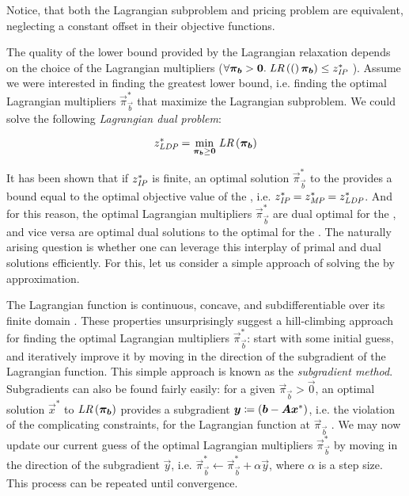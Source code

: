 Notice, that both the Lagrangian subproblem and pricing problem are equivalent, neglecting a constant offset in their objective functions.

The quality of the lower bound provided by the Lagrangian relaxation depends on the choice of the Lagrangian multipliers ($\forall \vec{\pi}_\vec{b} > \vec{0}. \; \LR(\vec{\pi}_\vec{b}) \leq z^*_\IP{}$ \cite{thebook}). Assume we were interested in finding the greatest lower bound, i.e. finding the optimal Lagrangian multipliers $\vec{\pi}_\vec{b}^*$ that maximize the Lagrangian subproblem. We could solve the following \textit{Lagrangian dual problem}:

\begin{equation*}
z^*_\LDP{} = \underset{\vec{\pi}_\vec{b} \geq \vec{0}}{\min} \; \LR{\vec{\pi}_\vec{b}}
\end{equation*}

It has been shown that if $z^*_{\textit{IP}}{}$ is finite, an optimal solution $\vec{\pi}_\vec{b}^*$ to the \LDP{} provides a bound equal to the optimal objective value of the \MP{}, i.e. $z^*_{\textit{IP}}{} = z^*_{\textit{MP}}{} = z^*_{\textit{LDP}}{}$. And for this reason, the optimal Lagrangian multipliers $\vec{\pi}_\vec{b}^*$ are dual optimal for the \MP{}, and vice versa are optimal dual solutions to the \MP{} optimal for the \LDP{} \cite{thebook}. The naturally arising question is whether one can leverage this interplay of primal and dual solutions efficiently. For this, let us consider a simple approach of solving the \LDP{} by approximation.

The Lagrangian function \LR{} is continuous, concave, and subdifferentiable over its finite domain \cite{thebook}. These properties unsurprisingly suggest a hill-climbing approach for finding the optimal Lagrangian multipliers $\vec{\pi}_\vec{b}^*$: start with some initial guess, and iteratively improve it by moving in the direction of the subgradient of the Lagrangian function. This simple approach is known as the \textit{subgradient method}. Subgradients can also be found fairly easily: for a given $\vec{\pi}_\vec{b} > \vec{0}$, an optimal solution $\vec{x}^*$ to $\LR{\vec{\pi}_\vec{b}}$ provides a subgradient ${\bm{y}} \coloneqq ({\bm{b}} - {\bm{A}} {\bm{x}}^*)$, i.e. the violation of the complicating constraints, for the Lagrangian function at $\vec{\pi}_\vec{b}$ \cite{thebook}. We may now update our current guess of the optimal Lagrangian multipliers $\vec{\pi}_\vec{b}^*$ by moving in the direction of the subgradient $\vec{y}$, i.e. $\vec{\pi}_\vec{b}^* \leftarrow \vec{\pi}_\vec{b}^* + \alpha \vec{y}$, where $\alpha$ is a step size. This process can be repeated until convergence.

